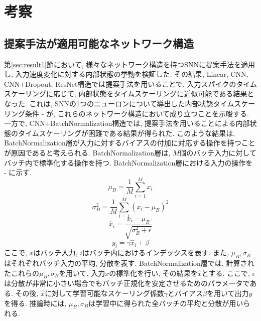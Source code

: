 \section{考察}
\subsection{提案手法が適用可能なネットワーク構造}
第\ref{sec:result1}節において, 様々なネットワーク構造を持つSNNに提案手法を適用し, 入力速度変化に対する内部状態の挙動を検証した.
その結果, Linear, CNN, CNN+Dropout, ResNet構造では提案手法を用いることで, 入力スパイクのタイムスケーリングに応じて, 内部状態をタイムスケーリングに近似可能である結果となった.
これは, SNNの1つのニューロンについて導出した内部状態タイムスケーリング条件 - が, これらのネットワーク構造において成り立つことを示唆する.
一方で, CNN+BatchNormalization構造では, 提案手法を用いることによる内部状態のタイムスケーリングが困難である結果が得られた.
このような結果は, BatchNormalization層が入力に対するバイアスの付加に対応する操作を持つことが原因であると考えられる.
BatchNormalization層は, $M$個のバッチ入力に対してバッチ内で標準化する操作を持つ.
BatchNormalization層における入力の操作を - に示す.
\begin{equation}
    \mu_B=\frac{1}{M}\sum_{i=1}^{M}x_i \label{eq:batchnormalization:input:mean}
\end{equation}
\begin{equation}
    \sigma_B^2=\frac{1}{M}\sum_{i=1}^{M}(x_i-\mu_B)^2 \label{eq:batchnormalization:input:variance}
\end{equation}
\begin{equation}
    \hat{x}_i=\frac{x_i-\mu_B}{\sqrt{\sigma_B^2+\epsilon}} \label{eq:batchnormalization:input:standardization}
\end{equation}
\begin{equation}
    y_i=\gamma\hat{x}_i+\beta \label{eq:batchnormalization:input:output}
\end{equation}
ここで, $x$はバッチ入力, $i$はバッチ内におけるインデックスを表す.
また, $\mu_B, \sigma_B$はそれぞれバッチ入力の平均, 分散を表す.
BatchNormalization層では, 計算されたこれらの$\mu_B, \sigma_B$を用いて, 入力$x$の標準化を行い, その結果を$\hat{x}$とする.
ここで, $\epsilon$は分散が非常に小さい場合でもバッチ正規化を安定させるためのパラメータである.
その後, $\hat{x}$に対して学習可能なスケーリング係数$\gamma$とバイアス$\beta$を用いて出力$y$を得る.
推論時には, $\mu_B, \sigma_B$は学習中に得られた全バッチの平均と分散が用いられる.

